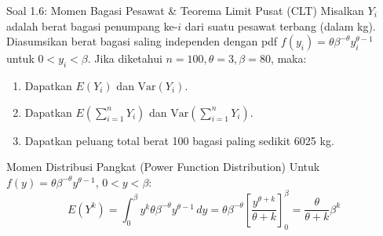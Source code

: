 \documentclass[10pt,twoside]{article}
\begin{document}
\begin{soalbox}{Soal 1.6: Momen Bagasi Pesawat \& Teorema Limit Pusat (CLT)}
Misalkan $Y_i$ adalah berat bagasi penumpang ke-$i$ dari suatu pesawat terbang (dalam kg). Diasumsikan berat bagasi saling independen dengan pdf $f(y_i) = \theta \beta^{-\theta} y_i^{\theta-1}$ untuk $0 < y_i < \beta$. Jika diketahui $n = 100, \theta = 3, \beta = 80$, maka:
\begin{enumerate}[label=(\alph*)]
  \item Dapatkan $E(Y_i)$ dan $\text{Var}(Y_i)$.
  \item Dapatkan $E\left(\sum_{i=1}^{n}Y_i\right)$ dan $\text{Var}\left(\sum_{i=1}^{n}Y_i\right)$.
  \item Dapatkan peluang total berat 100 bagasi paling sedikit 6025 kg.
\end{enumerate}
\end{soalbox}

\begin{tipbox}{Momen Distribusi Pangkat (Power Function Distribution)}
Untuk $f(y) = \theta \beta^{-\theta} y^{\theta-1}$, $0 < y < \beta$:
\[
E(Y^k) = \int_0^\beta y^k \theta \beta^{-\theta} y^{\theta-1} \, dy = \theta \beta^{-\theta} \left[\frac{y^{\theta+k}}{\theta+k}\right]_0^\beta = \frac{\theta}{\theta+k}\beta^k
\]
\end{tipbox}
\end{document}
